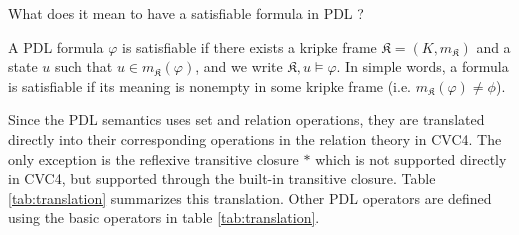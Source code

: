 \documentclass[12pt,a4paper]{article}
\begin{document}
What does it mean to have a satisfiable formula in PDL ?

A PDL formula $\varphi$ is satisfiable if there exists a kripke frame $\mathfrak{K}=(K, m_{\mathfrak{K}})$ and a state  $u$ such that $u \in m_{\mathfrak{K}}(\varphi) $, and we write $\mathfrak{K}, u \models \varphi$. In simple words, a formula is satisfiable if its meaning is nonempty in some kripke frame (i.e. $m_{\mathfrak{K}}(\varphi) \neq \phi$). 

Since the PDL semantics uses set and relation operations, they are translated directly into their corresponding operations in the relation theory in CVC4. The only exception is the reflexive transitive closure $*$ which is not supported directly in CVC4, but supported through the built-in transitive closure. Table \ref{tab:translation} summarizes this translation. Other PDL operators are defined using the basic operators in table \ref{tab:translation}. 
\end{document}
